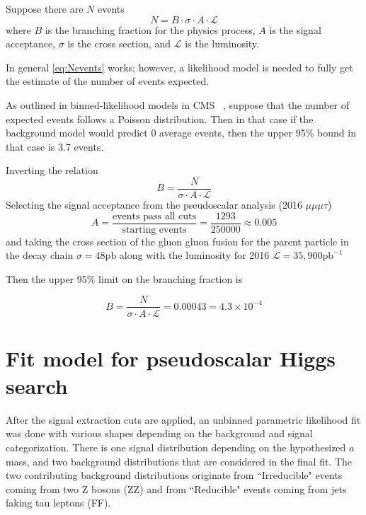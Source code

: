 Suppose there are $N$ events 
\begin{equation}
\label{eq:Nevents}
N = B\cdot \sigma \cdot A\cdot \mathcal{L}
\end{equation}
where $B$ is the branching fraction for the physics process, $A$ is the signal acceptance, $\sigma$ is the cross section, and $\mathcal{L}$ is the luminosity.


In general \ref{eq:Nevents} works; however, a likelihood model is needed to fully get the estimate of the number of events expected. 

As outlined in binned-likelihood models in CMS ~\cite{Cowan_2011}, suppose that the number of expected events follows a Poisson distribution. Then in that case if the background model would predict 0 average events, then the upper 95\% bound in that case is 3.7 events. 

Inverting the relation
\[B = \frac{N}{\sigma \cdot A\cdot \mathcal{L}}\]
Selecting the signal acceptance from the pseudoscalar analysis (2016 $\mu\mu\mu\tau$) 
\[ A = \frac{\text{events pass all cuts}}{\text{starting events}} = \frac{1293}{250000} \approx 0.005 \]
and taking the cross section of the gluon gluon fusion for the parent particle in the decay chain $\sigma = 48 \text{pb}$ along with the luminosity for 2016 $\mathcal{L} = 35,900 \text{pb}^{-1}$

Then the upper 95\% limit on the branching fraction is 

\[B =  \frac{N}{\sigma \cdot A\cdot \mathcal{L}} = 0.00043 = 4.3 \times 10^{-4}\]



\section{Fit model for pseudoscalar Higgs search}
After the signal extraction cuts are applied, an unbinned parametric likelihood fit was done with various shapes depending on the background and signal categorization. There is one signal distribution depending on the hypothesized $a$ mass, and two background distributions that are considered in the final fit. The two contributing background distributions originate from ``Irreducible" events coming from two Z bosons (ZZ) and from ``Reducible" events coming from jets faking tau leptons (FF).  


